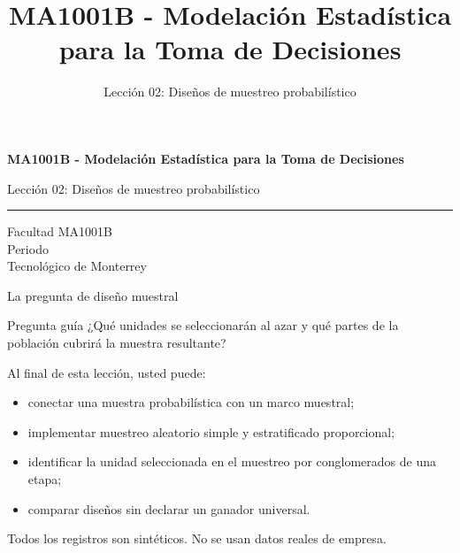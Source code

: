 \documentclass[aspectratio=169,10pt,spanish]{beamer}
\title{MA1001B - Modelación Estadística para la Toma de Decisiones}
\subtitle{Lección 02: Diseños de muestreo probabilístico}
\author{}
\institute{Tecnol\'ogico de Monterrey}
\date{}
\begin{document}
\begin{frame}[plain]
  \vspace{1.2cm}
  {\Large\bfseries MA1001B - Modelación Estadística para la Toma de Decisiones\par}
  \vspace{0.7cm}
  {\large Lección 02: Diseños de muestreo probabilístico\par}
  \vspace{0.7cm}
  {\color{TecRojo}\rule{\textwidth}{1.2pt}}
  \vspace{0.8cm}

  Facultad MA1001B\\[0.3cm]
  Periodo\\[0.3cm]
  Tecnol\'ogico de Monterrey
\end{frame}

\begin{frame}{La pregunta de diseño muestral}
  \begin{alertblock}{Pregunta guía}
    ¿Qué unidades se seleccionarán al azar y qué partes de la población cubrirá
    la muestra resultante?
  \end{alertblock}

  \vspace{0.5em}
  Al final de esta lección, usted puede:
  \begin{itemize}
    \item conectar una muestra probabilística con un marco muestral;
    \item implementar muestreo aleatorio simple y estratificado proporcional;
    \item identificar la unidad seleccionada en el muestreo por conglomerados
      de una etapa;
    \item comparar diseños sin declarar un ganador universal.
  \end{itemize}

  \vfill
  \scriptsize Todos los registros son sintéticos. No se usan datos reales de empresa.
\end{frame}
\end{document}
